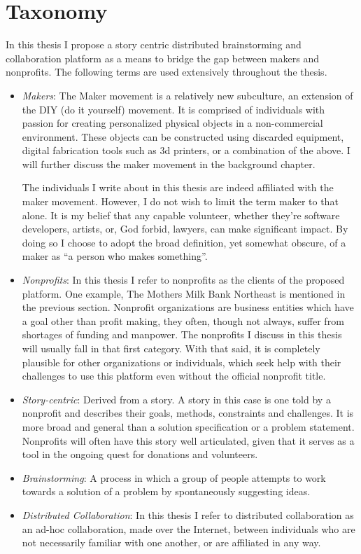 \section{Taxonomy}
In this thesis I propose a story centric distributed brainstorming and collaboration platform as a means to bridge the gap between makers and nonprofits. The following terms are used extensively throughout the thesis.

\begin{itemize}
\item \textit{Makers}:
The Maker movement is a relatively new subculture, an extension of the DIY (do it yourself) movement. It is comprised of individuals with passion for creating personalized physical objects in a non-commercial environment. These objects can be constructed using discarded equipment, digital fabrication tools such as 3d printers, or a combination of the above. I will further discuss the maker movement in the background chapter.

The individuals I write about in this thesis are indeed affiliated with the maker movement. However, I do not wish to limit the term maker to that alone. It is my belief that any capable volunteer, whether they're software developers, artists, or, God forbid, lawyers, can make significant impact. By doing so I choose to adopt the broad definition, yet somewhat obscure, of a maker as ``a person who makes something''. 

\item \textit{Nonprofits}: 
In this thesis I refer to nonprofits as the clients of the proposed platform. One example, The Mothers Milk Bank Northeast is mentioned in the previous section. Nonprofit organizations are business entities which have a goal other than profit making, they often, though not always, suffer from shortages of funding and manpower. The nonprofits I discuss in this thesis will usually fall in that first category. With that said, it is completely plausible for other organizations or individuals, which seek help with their challenges to use this platform even without the official nonprofit title.

\item \textit{Story-centric}:
Derived from a story. A story in this case is one told by a nonprofit and describes their goals, methods, constraints and challenges. It is more broad and general than a solution specification or a problem statement. Nonprofits will often have this story well articulated, given that it serves as a tool in the ongoing quest for donations and volunteers. 

\item \textit{Brainstorming}:
A process in which a group of people attempts to work towards a solution of a problem by spontaneously suggesting ideas. 

\item \textit{Distributed Collaboration}:
In this thesis I refer to distributed collaboration as an ad-hoc collaboration, made over the Internet, between individuals who are not necessarily familiar with one another, or are affiliated in any way.  

\end{itemize}

